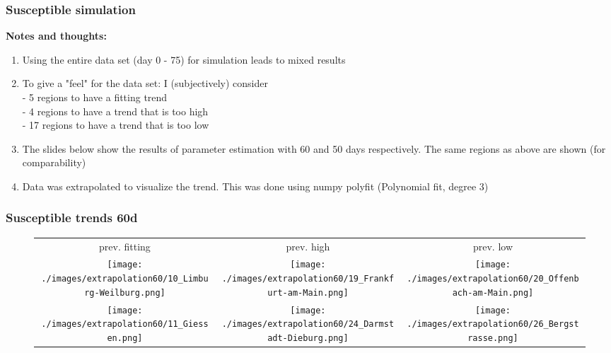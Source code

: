 \documentclass{beamer}
\begin{document}
\begin{frame}
	\frametitle{Susceptible simulation}
	\textbf{Notes and thoughts:}
	\begin{enumerate}[$\bullet$]
		\item Using the entire data set (day 0 - 75) for simulation leads to mixed results
		\item To give a "feel" for the data set: I (subjectively) consider\\
			- 5 regions to have a fitting trend\\
			- 4 regions to have  a trend that is too high\\
			- 17 regions to have a trend that is too low
		\item The slides below show the results of parameter estimation with 60 and 50 days respectively. The same regions as above are shown (for comparability)
		\item Data was extrapolated to visualize the trend. This was done using numpy polyfit (Polynomial fit, degree 3)
	\end{enumerate}
\end{frame}

\begin{frame}
	\frametitle{Susceptible trends 60d}
	\begin{center}
		\begin{figure}
			\begin{adjustwidth}{-0.8cm}{}
			\begin{tabular}{ccc}
				prev. fitting & prev. high & prev. low \\
				\texttt{[image: ./images/extrapolation60/10\_Limburg-Weilburg.png]}
					& \texttt{[image: ./images/extrapolation60/19\_Frankfurt-am-Main.png]}
					& \texttt{[image: ./images/extrapolation60/20\_Offenbach-am-Main.png]} \\
				\texttt{[image: ./images/extrapolation60/11\_Giessen.png]}
					& \texttt{[image: ./images/extrapolation60/24\_Darmstadt-Dieburg.png]}
					& \texttt{[image: ./images/extrapolation60/26\_Bergstrasse.png]}
			\end{tabular}
			\end{adjustwidth}
		\end{figure}
	\end{center}
\end{frame}
\end{document}
